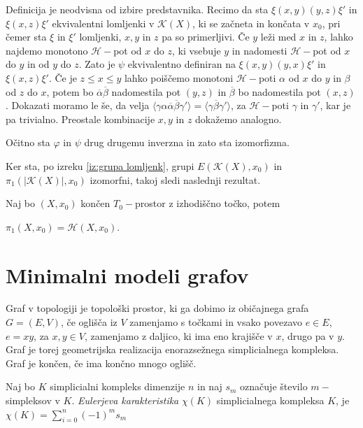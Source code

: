 \documentclass[mat1]{fmfdelo}
\DeclareRobustCommand{\h}{
    \mathcal{H}}
\DeclareRobustCommand{\pot}{
    $\h-$pot
}
\begin{document}
\begin{dokaz}
Definicija je neodvisna od izbire predstavnika. Recimo da sta $\xi(x,y)(y,z)\xi'$ in $\xi(x,z)\xi'$ ekvivalentni lomljenki v $\mathcal{K}(X)$, ki se začneta in končata v $x_0$, pri čemer sta $\xi$ in $\xi'$ lomljenki, $x,y$ in $z$ pa so primerljivi.
Če $y$ leži med $x$ in $z$, lahko najdemo monotono $\mathcal{H}-$pot od $x$ do $z$, ki vsebuje $y$ in nadomesti \pot od $x$ do $y$ in od $y$ do $z$. Zato je $\psi$ ekvivalentno definiran na $\xi(x,y)(y,x)\xi'$ in $\xi(x,z)\xi'$.
Če je $z\leq x \leq y$ lahko poiščemo monotoni $\mathcal{H}-$poti $\alpha$ od $x$ do $y$ in $\beta$ od $z$ do $x$, potem bo $\overline{\alpha}\overline{\beta}$ nadomestila pot $(y,z)$ in $\overline{\beta}$ bo nadomestila pot $(x,z)$. Dokazati moramo le še, da velja $\langle\gamma \alpha \overline{\alpha}\overline{\beta}\gamma'\rangle=\langle \gamma\overline{\beta}\gamma'\rangle$, za $\h-$poti $\gamma$ in $\gamma'$, kar je pa trivialno. Preostale kombinacije $x,y$ in $z$ dokažemo analogno.

Očitno sta $\varphi$ in $\psi$ drug drugemu inverzna in zato sta izomorfizma.
\end{dokaz}

Ker sta, po izreku \ref{iz:grupa lomljenk}, grupi $E(\mathcal{K}(X),x_0)$ in $\pi_1(|\mathcal{K}(X)|,x_0)$ izomorfni, takoj sledi naslednji rezultat.

\begin{posledica}
    Naj bo $(X,x_0)$ končen $T_0-$prostor z izhodiščno točko, potem 
    
    $\pi_1(X,x_0)=\mathscr{H}(X,x_0)$.
\end{posledica}

\section{Minimalni modeli grafov}

Graf v topologiji je topološki prostor, ki ga dobimo iz običajnega grafa 
$G=(E,V)$, če oglišča iz $V$ zamenjamo s točkami in vsako povezavo $e\in 
E$, $e=xy$, za $x,y\in V$, zamenjamo z daljico, ki ima eno krajišče v $x$, drugo pa v $y$.
Graf je torej geometrijska realizacija enorazsežnega simplicialnega 
kompleksa. Graf je končen, če ima končno mnogo oglišč. 



\begin{definicija}
    Naj bo $K$ simplicialni kompleks dimenzije $n$ in naj $s_m$ označuje število $m-$simpleksov v $K$.
    \emph{Eulerjeva karakteristika} $\chi(K)$ simplicialnega kompleksa $K$, je  $\chi(K)=\sum\limits_{i=0}^n (-1)^m s_m$
\end{definicija}
\end{document}
